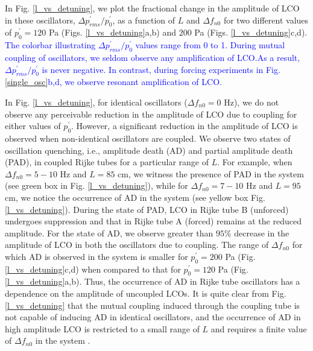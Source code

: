 \documentclass[%
preprint,
 amsmath,amssymb,
 aps,
 pra,
]{revtex4-2}
\begin{document}
In Fig. \ref{l_vs_detuning}, we plot the fractional change in the amplitude of LCO in these oscillators, $\Delta p^\prime_{rms}/p^\prime_{0}$, as a function of $L$ and $\Delta f_{n0}$ for two different values of $p^\prime_0=120$ Pa (Figs. \ref{l_vs_detuning}a,b) and $200$ Pa (Figs. \ref{l_vs_detuning}c,d). \textcolor{blue}{The colorbar illustrating $\Delta p^\prime_{rms}/p^\prime_{0}$ values range from 0 to 1. During mutual coupling of oscillators, we seldom observe any amplification of LCO.As a result, $\Delta p^\prime_{rms}/p^\prime_{0}$ is never negative. In contrast, during forcing experiments in Fig. \ref{single_osc}b,d, we observe resonant amplification of LCO.}

In Fig. \ref{l_vs_detuning}, for identical oscillators ($\Delta f_{n0}=0$ Hz), we do not observe any perceivable reduction in the amplitude of LCO due to coupling for either values of $p^\prime_0$. However, a significant reduction in the amplitude of LCO is observed when non-identical oscillators are coupled. We observe two states of oscillation quenching, i.e., amplitude death (AD) and partial amplitude death (PAD), in coupled Rijke tubes for a particular range of $L$. For example, when $\Delta f_{n0} = 5-10$ Hz and $L=85$ cm, we witness the presence of PAD in the system (see green box in Fig.  \ref{l_vs_detuning}), while for $\Delta f_{n0}=7-10$ Hz and $L=95$ cm, we notice the occurrence of AD in the system (see yellow box Fig.  \ref{l_vs_detuning}). During the state of PAD, LCO in Rijke tube B (unforced) undergoes suppression and that in Rijke tube A (forced) remains at the reduced amplitude. For the state of AD, we observe greater than $95\%$ decrease in the amplitude of LCO in both the oscillators due to coupling. The range of $\Delta f_{n0}$ for which AD is observed in the system is smaller for $p^\prime_0=200$ Pa (Fig.  \ref{l_vs_detuning}c,d) when compared to that for $p^\prime_0=120$ Pa (Fig.  \ref{l_vs_detuning}a,b). Thus, the occurrence of AD in Rijke tube oscillators has a dependence on the amplitude of uncoupled LCOs. It is quite clear from Fig.  \ref{l_vs_detuning} that the mutual coupling induced through the coupling tube is not capable of inducing AD in identical oscillators, and the occurrence of AD in high amplitude LCO is restricted to a small range of $L$ and requires a finite value of $\Delta f_{n0}$ in the system \cite{dange2019oscillation}.
\end{document}
